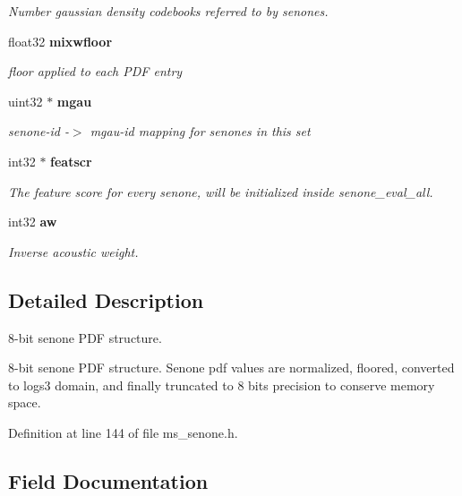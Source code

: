 \begin{DoxyCompactItemize}
\begin{DoxyCompactList}\small\item\em Number gaussian density codebooks referred to by senones. \end{DoxyCompactList}\item 
float32 {\bf mixwfloor}\label{structsenone__t_af3f77493f07dd1740084ea8dc4541cb1}

\begin{DoxyCompactList}\small\item\em floor applied to each P\-D\-F entry \end{DoxyCompactList}\item 
uint32 $\ast$ {\bf mgau}\label{structsenone__t_a5f0eee5a11e7c10b20e0cce10305edfc}

\begin{DoxyCompactList}\small\item\em senone-\/id -\/$>$ mgau-\/id mapping for senones in this set \end{DoxyCompactList}\item 
int32 $\ast$ {\bf featscr}\label{structsenone__t_a58af20c262d9d633f53c8c1c7e60459e}

\begin{DoxyCompactList}\small\item\em The feature score for every senone, will be initialized inside senone\-\_\-eval\-\_\-all. \end{DoxyCompactList}\item 
int32 {\bf aw}\label{structsenone__t_ad9b17f6aecf056fcea0eaaab0c7d35ca}

\begin{DoxyCompactList}\small\item\em Inverse acoustic weight. \end{DoxyCompactList}\end{DoxyCompactItemize}


\subsection{Detailed Description}
8-\/bit senone P\-D\-F structure. 

8-\/bit senone P\-D\-F structure. Senone pdf values are normalized, floored, converted to logs3 domain, and finally truncated to 8 bits precision to conserve memory space. 

Definition at line 144 of file ms\-\_\-senone.\-h.



\subsection{Field Documentation}
